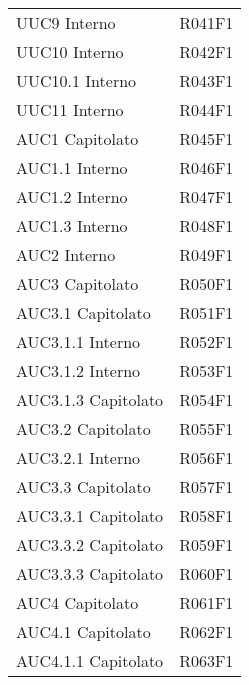\documentclass[../analisi-dei-requisiti.tex]{subfiles}
\begin{document}
\begin{longtable}[H]{ p{4cm} | p{4cm} }
  UUC9 Interno                  & R041F1                               \\
  UUC10 Interno                 & R042F1                               \\
  UUC10.1 Interno               & R043F1                               \\
  UUC11 Interno                 & R044F1                               \\
  AUC1 Capitolato               & R045F1                               \\
  AUC1.1 Interno                & R046F1                               \\
  AUC1.2 Interno                & R047F1                               \\
  AUC1.3 Interno                & R048F1                               \\
  AUC2 Interno                  & R049F1                               \\
  AUC3 Capitolato               & R050F1                               \\
  AUC3.1 Capitolato             & R051F1                               \\
  AUC3.1.1 Interno              & R052F1                               \\
  AUC3.1.2 Interno              & R053F1                               \\
  AUC3.1.3 Capitolato           & R054F1                               \\
  AUC3.2 Capitolato             & R055F1                               \\
  AUC3.2.1 Interno              & R056F1                               \\
  AUC3.3 Capitolato             & R057F1                               \\
  AUC3.3.1 Capitolato           & R058F1                               \\
  AUC3.3.2 Capitolato           & R059F1                               \\
  AUC3.3.3 Capitolato           & R060F1                               \\
  AUC4 Capitolato               & R061F1                               \\
  AUC4.1 Capitolato             & R062F1                               \\
  AUC4.1.1 Capitolato           & R063F1                               \\

\end{longtable}
\end{document}

